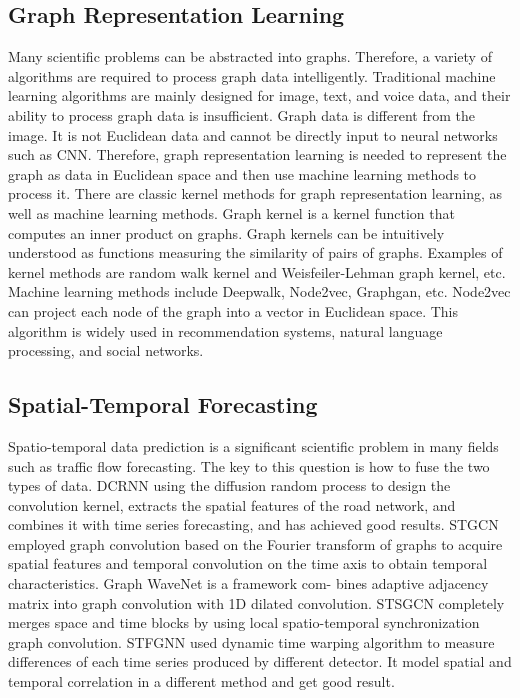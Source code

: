 \documentclass[conference]{IEEEtran}
\begin{document}
\subsection{Graph Representation Learning}
Many scientific problems can be abstracted into graphs. Therefore, a variety of algorithms are required to process graph data intelligently. Traditional machine learning algorithms are mainly designed for image, text, and voice data, and their ability to process graph data is insufficient. Graph data is different from the image. It is not Euclidean data and cannot be directly input to neural networks such as CNN. Therefore, graph representation learning is needed to represent the graph as data in Euclidean space and then use machine learning methods to process it\cite{b10}. There are classic kernel methods for graph representation learning, as well as machine learning methods. Graph kernel is a kernel function that computes an inner product on graphs. Graph kernels can be intuitively understood as functions measuring the similarity of pairs of graphs. Examples of kernel methods are random walk kernel and Weisfeiler-Lehman graph kernel, etc. Machine learning methods include Deepwalk\cite{b11}, Node2vec\cite{b12}, Graphgan\cite{b13}, etc. Node2vec can project each node of the graph into a vector in Euclidean space\cite{b14}. This algorithm is widely used in recommendation systems, natural language processing, and social networks.
\subsection{Spatial-Temporal Forecasting}
Spatio-temporal data prediction is a significant scientific problem in many fields such as traffic flow forecasting. The key to this question is how to fuse the two types of data. 
DCRNN\cite{b15} using the diffusion random process to design the convolution kernel, extracts the spatial features of the road network, and combines it with time series forecasting, and has achieved good results. STGCN\cite{b16} employed graph convolution based on the Fourier transform of graphs to acquire spatial features and temporal convolution on the time axis to obtain temporal characteristics. Graph WaveNet\cite{b17} is a framework com-
bines adaptive adjacency matrix into graph convolution
with 1D dilated convolution. STSGCN \cite{b18}completely merges space and time blocks by using local spatio-temporal synchronization graph convolution. STFGNN \cite{b19} used dynamic time warping algorithm to measure differences of each time series produced by different detector. It model spatial and temporal correlation in a different method and get good result. 
\end{document}
